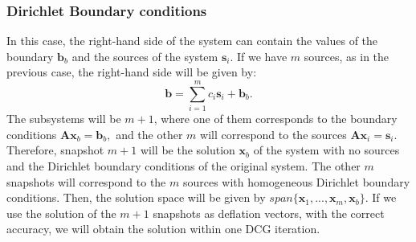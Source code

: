 \documentclass[12pt]{article}
\begin{document}
\subsubsection*{{Dirichlet Boundary conditions}}
In this case, the right-hand side of the system can contain the values of the boundary $\mathbf{b}_b$ and the sources of the system $\mathbf{s}_i$. 
If we have $m$ sources, as in the previous case, the right-hand side will be given by:
$$\mathbf{b}=\sum_{i=1}^{m} {c}_i\mathbf{s}_i+\mathbf{b}_b.$$
The subsystems will be $m+1$, where one of them corresponds to the boundary conditions
 $\mathbf{A}\mathbf{x}_b=\mathbf{b}_b,$
 and the other $m$ will correspond to the sources
$\mathbf{A}\mathbf{x}_i=\mathbf{s}_i.$
Therefore, snapshot $m+1$ will be the solution $\mathbf{x}_b$ of the system with no sources and the Dirichlet boundary conditions of the original system. The other $m$ snapshots will correspond to the $m$ sources with homogeneous Dirichlet boundary conditions. Then, the solution space will be given by $ span\{\mathbf{x}_1,...,\mathbf{x}_{m},\mathbf{x}_b\}$.
If we use the solution of the $m+1$ snapshots as deflation vectors, with the correct accuracy, we will obtain the solution within one DCG iteration.
\end{document}
